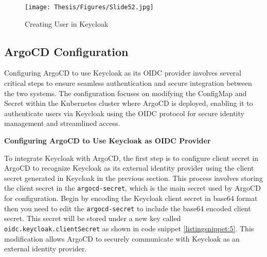 \begin{figure}[h]
\centering
\texttt{[image: Thesis/Figures/Slide52.jpg]}
\caption{\label{fig:Keycloak user}Creating User in Keycloak}
\end{figure}


\subsection{ArgoCD Configuration}

Configuring ArgoCD to use Keycloak as its OIDC provider involves several critical steps to ensure seamless authentication and secure integration between the two systems. The configuration focuses on modifying the ConfigMap and Secret within the Kubernetes cluster where ArgoCD is deployed, enabling it to authenticate users via Keycloak using the OIDC protocol for secure identity management and streamlined access. \cite{argocd_docs}


\textbf{Configuring ArgoCD to Use Keycloak as OIDC Provider}

To integrate Keycloak with ArgoCD, the first step is to configure client secret in ArgoCD to recognize Keycloak as its external identity provider using the client secret generated in Keycloak in the previous section. This process involves storing the client secret in the \texttt{argocd-secret}, which is the main secret used by ArgoCD for configuration. Begin by encoding the Keycloak client secret in base64 format then you need to edit the \texttt{argocd-secret} to include the base64 encoded client secret. This secret will be stored under a new key called \texttt{oidc.keycloak.clientSecret} as shown in code snippet \autoref{listingsnippet:5}. This modification allows ArgoCD to securely communicate with Keycloak as an external identity provider. \cite{argocd_docs}



